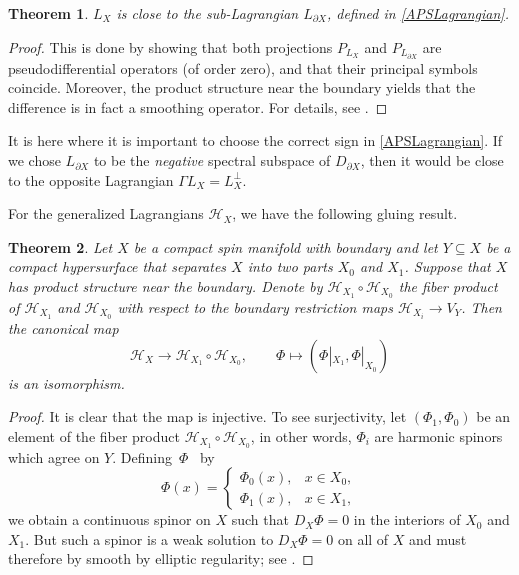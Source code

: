 \documentclass[10pt,a4paper]{amsart}
\numberwithin{equation}{section}
\newtheorem{Theorem}{Theorem}[section]
\begin{document}
\begin{Theorem}
\label{ThmClosed}
 $L_X$ is close to the sub-Lagrangian $L_{\partial X}$, defined in \eqref{APSLagrangian}.
\end{Theorem}

\begin{proof}
This is done by showing that both projections $P_{L_X}$ and $P_{L_{\partial X}}$ are pseudodifferential operators (of order zero), and that their principal symbols coincide.
Moreover, the product structure near the boundary yields that the difference is in fact a smoothing operator.
For details, see \cite[Remark~3.16]{LudewigRoos}.
\end{proof}

\begin{Remark}
It is here where it is important to choose the correct sign in \eqref{APSLagrangian}.
If we chose $L_{\partial X}$ to be the \emph{negative} spectral subspace of $D_{\partial X}$, then it would be close to the opposite Lagrangian $\Gamma L_X = L_X^\perp$.
\end{Remark}

For the generalized Lagrangians $\mathcal{H}_X$, we have the following gluing result.

\begin{Theorem} \label{TheoremFunctoriality}
Let $X$ be a compact spin manifold with boundary and let $Y \subseteq X$ be a compact hypersurface that separates $X$ into two parts $X_0$ and $X_1$.
Suppose that $X$ has product structure near the boundary.
Denote by $\mathcal{H}_{X_1} \circ \mathcal{H}_{X_0}$ the fiber product of $\mathcal{H}_{X_1}$ and $\mathcal{H}_{X_0}$ with respect to the boundary restriction maps $\mathcal{H}_{X_i} \to V_Y$.
Then the canonical map
\begin{equation*}
 \mathcal{H}_X \longrightarrow \mathcal{H}_{X_1} \circ \mathcal{H}_{X_0}, \qquad \Phi \longmapsto (\Phi|_{X_{1}}, \Phi|_{X_{0}})
\end{equation*}
is an isomorphism.
\end{Theorem}

\begin{proof}
It is clear that the map is injective.
To see surjectivity, let $(\Phi_{1}, \Phi_{0})$ be an element of the fiber product $\mathcal{H}_{X_{1}} \circ \mathcal{H}_{X_{0}}$, in other words, $\Phi_{i}$ are harmonic spinors which agree on $Y$.
Defining~$\Phi$~ by
\begin{equation*}
 \Phi(x) = \begin{cases} \Phi_{0}(x), & x \in X_{0}, \\ \Phi_{1}(x), & x \in X_{1}, \end{cases}
\end{equation*}
we obtain a continuous spinor on $X$ such that $D_X \Phi = 0$ in the interiors of $X_{0}$ and $X_{1}$.
But such a spinor is a weak solution to $D_X \Phi = 0$ on all of $X$ and must therefore by smooth by elliptic regularity; see \cite[Lemma 3.15]{LudewigRoos}.
\end{proof}
\end{document}
